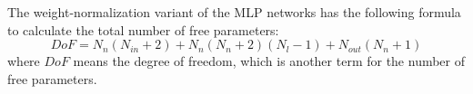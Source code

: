 The weight-normalization variant of the MLP networks has the following formula to calculate the total number of free parameters:
\begin{equation}\label{eq:dof-calculator}
    DoF =
     N_{n} \left(N_{in} + 2\right) + 
    N_{n} \left(N_{n} + 2 \right) \left(N_l-1\right) +
     N_{out}\left(N_{n} + 1\right)
\end{equation}
where $DoF$ means the degree of freedom, which is another term for the number of free parameters.
